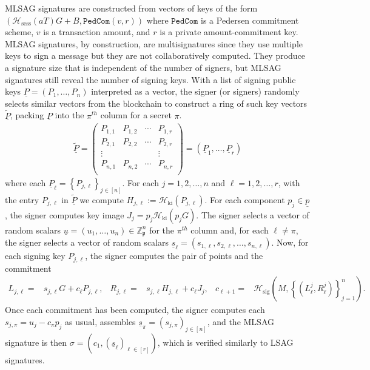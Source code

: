 \documentclass{mrl}
\theoremstyle{definition}
\numberwithin{theorem}{subsection}
\newcommand{\scalarField}{\mathbb{Z}_{\mathfrak{p}}}
\begin{document}
MLSAG signatures are constructed from vectors of keys of the form $(\mathcal{H}_{\text{sess}}(a T) G + B, \texttt{PedCom}(v, r))$ where $\texttt{PedCom}$ is a Pedersen commitment scheme, $v$ is a transaction amount, and $r$ is a private amount-commitment key. MLSAG signatures, by construction, are multisignatures since they use multiple keys to sign a message but they are not collaboratively computed. They produce a signature size that is independent of the number of signers, but MLSAG signatures still reveal the number of signing keys. With a list of signing public keys $\underline{P} = (P_1,\ldots,P_n)$ interpreted as a vector, the signer (or signers) randomly selects similar vectors from the blockchain to construct a ring of such key vectors $\widetilde{\underline{P}}$, packing $\underline{P}$ into the $\pi^{th}$ column for a secret $\pi$. \begin{align*}
\widetilde{\underline{P}} = 
\begin{pmatrix} 
P_{1,1} & P_{1, 2} & \cdots & P_{1, r} \\
P_{2,1} & P_{2, 2} & \cdots & P_{2, r} \\
\vdots &  & & \vdots \\
P_{n,1} & P_{n, 2} & \cdots & P_{n,r} \\
\end{pmatrix} = (\underline{P}_1, \ldots, \underline{P}_r)\end{align*} where each $\underline{P}_\ell = \left\{P_{j,\ell}\right\}_{j \in [n]}$. For each $j = 1, 2, \ldots, n$ and $\ell = 1, 2, \ldots, r$, with the entry $P_{j,\ell}$ in $\widetilde{\underline{P}}$ we compute $H_{j,\ell} := \mathcal{H}_{\text{ki}}(P_{j,\ell})$. For each component $p_j \in \underline{p}$, the signer computes key image $J_j = p_j \mathcal{H}_{\text{ki}}(p_j G)$. The signer selects a vector of random scalars $\underline{u} = (u_1, \ldots, u_n) \in \scalarField^n$ for the $\pi^{th}$ column and, for each $\ell \neq \pi$, the signer selects a vector of random scalars $\underline{s}_\ell = (s_{1,\ell}, s_{2,\ell}, \ldots, s_{n,\ell})$. Now, for each signing key $P_{j, \ell}$, the signer computes the pair of points and the commitment
\begin{align*}
L_{j, \ell} =& s_{j,\ell} G + c_\ell P_{j, \ell},  & R_{j,\ell} =& s_{j,\ell} H_{j, \ell} + c_\ell J_j, &
c_{\ell+1} =& \mathcal{H}_{\text{sig}}\left(M,\left\{(L_{\ell}^{j}, R_{\ell}^{j} )\right\}_{j=1}^{n}\right).
\end{align*}
Once each commitment has been computed, the signer computes each $s_{j,\pi} = u_j - c_\pi p_j$ as usual, assembles $\underline{s}_\pi = (s_{j, \pi})_{j \in [n]}$, and the MLSAG signature is then $\sigma = (c_1, (\underline{s}_\ell)_{\ell \in [r]})$, which is verified similarly to LSAG signatures. 
\end{document}
